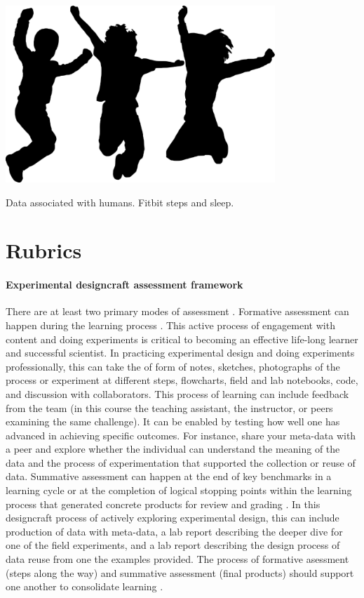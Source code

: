 \documentclass[
]{book}
\begin{document}
\includegraphics[width=4in,height=\textheight]{./humans.png}

Data associated with humans. Fitbit steps and sleep.

\hypertarget{rubrics}{%
\chapter{Rubrics}\label{rubrics}}

\hypertarget{experimental-designcraft-assessment-framework}{%
\subsubsection*{Experimental designcraft assessment framework}\label{experimental-designcraft-assessment-framework}}

There are at least two primary modes of assessment \citep{RN6795}. Formative assessment can happen during the learning process \citep{RN6796}. This active process of engagement with content and doing experiments is critical to becoming an effective life-long learner and successful scientist. In practicing experimental design and doing experiments professionally, this can take the of form of notes, sketches, photographs of the process or experiment at different steps, flowcharts, field and lab notebooks, code, and discussion with collaborators. This process of learning can include feedback from the team (in this course the teaching assistant, the instructor, or peers examining the same challenge). It can be enabled by testing how well one has advanced in achieving specific outcomes. For instance, share your meta-data with a peer and explore whether the individual can understand the meaning of the data and the process of experimentation that supported the collection or reuse of data. Summative assessment can happen at the end of key benchmarks in a learning cycle or at the completion of logical stopping points within the learning process that generated concrete products for review and grading \citep{RN6798}. In this designcraft process of actively exploring experimental design, this can include production of data with meta-data, a lab report describing the deeper dive for one of the field experiments, and a lab report describing the design process of data reuse from one the examples provided. The process of formative asessment (steps along the way) and summative assessment (final products) should support one another to consolidate learning \citep{RN6797}.
\end{document}
